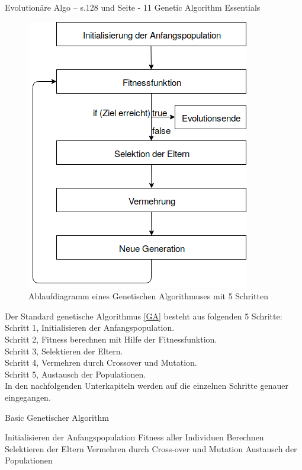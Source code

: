 Evolutionäre Algo -- s.128 und Seite - 11 Genetic Algorithm Essentials

\noindent%
\begin{figure}[H]
  \centering  
  \includegraphics[scale=0.6]{img/Ablauf_kurz.png}
  \caption{Ablaufdiagramm eines Genetischen Algorithmuses mit 5 Schritten}
  \label{fig:Ablauf_kurz}
\end{figure}


Der Standard genetische Algorithmus \ref{GA} besteht aus folgenden 5 Schritte: \\
Schritt 1, Initialisieren der Anfangspopulation.	\\
Schritt 2, Fitness berechnen mit Hilfe der Fitnessfunktion.	\\
Schritt 3, Selektieren der Eltern.	\\
Schritt 4, Vermehren durch Crossover und Mutation.	\\
Schritt 5, Austausch der Populationen.	\\
In den nachfolgenden Unterkapiteln werden auf die einzelnen Schritte genauer eingegangen.	 \\

\begin{algorithm}
\caption{Basic Genetischer Algorithm }
\begin{algorithmic}[1]
\State Initialisieren der Anfangspopulation   
	\State Fitness aller Individuen Berechnen
	\State Selektieren der Eltern
	\State Vermehren durch Cross-over und Mutation
	\State Austausch der Populationen
\EndWhile

\label{GA}
\end{algorithmic}
\end{algorithm}

